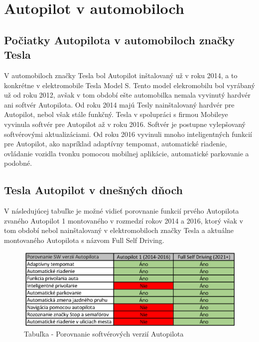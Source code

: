 \documentclass[10pt,twoside,slovak,a4paper]{article}
\begin{document}
\section{Autopilot v automobiloch}

\subsection{Počiatky Autopilota v automobiloch značky Tesla} \label{PAVAZ}

V automobiloch značky Tesla bol Autopilot inštalovaný už v roku 2014, a to konkrétne v elektromobile Tesla Model S. Tento model elekromobilu bol vyrábaný už od roku 2012, avšak v tom období ešte automobilka nemala vyvinutý hardvér ani softvér Autopilota. Od roku 2014 majú Tesly nainštalovaný hardvér pre Autopilot, nebol však stále funkčný. Tesla v spolupráci s firmou Mobileye vyvinula softvér pre Autopilot až v roku 2016. Softvér je postupne vylepšovaný softvérovými aktualizáciami. Od roku 2016 vyvinuli mnoho inteligentných funkcií pre Autopilot, ako napríklad adaptívny tempomat, automatické riadenie, ovládanie vozidla tvonku pomocou mobilnej aplikácie, automatické parkovanie a podobné.\cite{Skokan}

\subsection{Tesla Autopilot v dnešných dňoch}

V následujúcej tabuľke je možné vidieť porovnanie funkcií prvého Autopilota zvaného Autopilot 1 montovaného v rozmedzí rokov 2014 a 2016, ktorý však v tom období nebol nainštalovaný v elektromobiloch značky Tesla a aktuálne montovaného Autopilota s názvom Full Self Driving. 

\begin{figure}[tbh]
\centering
\includegraphics[scale=0.80]{tabulka.png}
\caption{Tabuľka - Porovnanie softvérových verzií Autopilota\cite{Skokan}}
\label{f:tabulka}
\end{figure}
\end{document}
